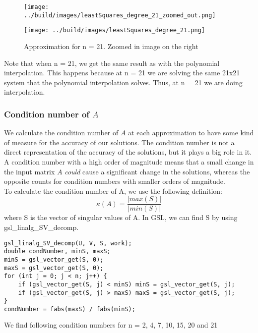 \documentclass[11pt, a4paper, titlepage, openright]{article}
\begin{document}
    \begin{figure}[H]
        \begin{minipage}[b]{0.49\textwidth}
            \texttt{[image: ../build/images/leastSquares\_degree\_21\_zoomed\_out.png]}
        \end{minipage}
        \hfill
        \begin{minipage}[b]{0.49\textwidth}
            \texttt{[image: ../build/images/leastSquares\_degree\_21.png]}
        \end{minipage}
        \caption{Approximation for n = 21. Zoomed in image on the right}
        \label{fig:results4}
    \end{figure}
    Note that when n = 21, we get the same result as with the polynomial interpolation.
    This happens because at n = 21 we are solving the same 21x21 system that the polynomial interpolation solves.
    Thus, at n = 21 we are doing interpolation.

\subsubsection{Condition number of \(A\)}
    We calculate the condition number of \(A\) at each approximation to have some kind of measure for the accuracy of our solutions.
    The condition number is not a direct representation of the accuracy of the solutions, but it plays a big role in it.
    A condition number with a high order of magnitude means that a small change in the input matrix \(A\) \emph{could}
    cause a significant change in the solutions, whereas the opposite counts for condition numbers with smaller orders of magnitude.\\
    To calculate the condition number of A, we use the following definition: \[\kappa(A)= \frac{|max(S)|}{|min(S)|} \]
    where S is the vector of singular values of A. In GSL, we can find S by using gsl\_linalg\_SV\_decomp.
\begin{lstlisting}
gsl_linalg_SV_decomp(U, V, S, work);
double condNumber, minS, maxS;
minS = gsl_vector_get(S, 0);
maxS = gsl_vector_get(S, 0);
for (int j = 0; j < n; j++) {
    if (gsl_vector_get(S, j) < minS) minS = gsl_vector_get(S, j);
    if (gsl_vector_get(S, j) > maxS) maxS = gsl_vector_get(S, j);
}
condNumber = fabs(maxS) / fabs(minS);
\end{lstlisting}
    We find following condition numbers for n = 2, 4, 7, 10, 15, 20 and 21
\begin{lstlisting}

\end{lstlisting}
\end{document}
